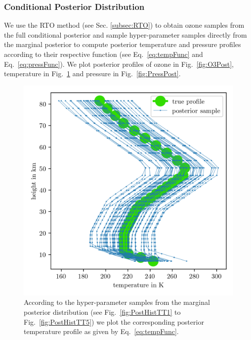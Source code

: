 \subsubsection{Conditional Posterior Distribution}
We use the RTO method (see Sec. \ref{subsec:RTO}) to obtain ozone samples from the full conditional posterior and sample hyper-parameter samples directly from the marginal posterior to compute posterior temperature and pressure profiles according to their respective function (see Eq.~\ref{eq:tempFunc} and Eq.~\ref{eq:pressFunc}). 
We plot posterior profiles of ozone in Fig.~\ref{fig:O3Post}, temperature in Fig.~\ref{fig:TempPost} and pressure in Fig.~\ref{fig:PressPost}.
\begin{figure}[ht!]
	\centering
	\includegraphics{TempPostMeanSigm.png} 
	\caption[Temperature posterior samples.]{According to the hyper-parameter samples from the marginal posterior distribution (see Fig.~\ref{fig:PostHistTT1} to Fig.~\ref{fig:PostHistTT5}) we plot the corresponding posterior temperature profile as given by Eq.~\ref{eq:tempFunc}. }
	\label{fig:TempPost}
\end{figure}

